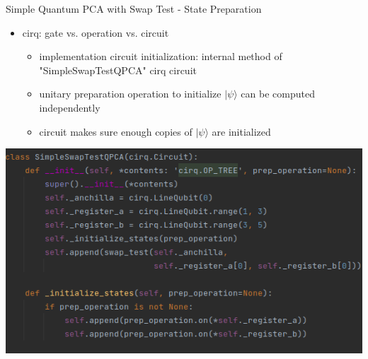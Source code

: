 \begin{frame}{Simple Quantum PCA with Swap Test - State Preparation}
  \begin{minipage}{0.5\textwidth}
    \begin{itemize}
      \item cirq: gate vs. operation vs. circuit
      \begin{itemize}
        \item implementation circuit initialization: internal method of "SimpleSwapTestQPCA" cirq circuit
        \item unitary preparation operation to initialize $|\psi\rangle$ can be computed independently
        \item circuit makes sure enough copies of $|\psi\rangle$ are initialized
      \end{itemize}
    \end{itemize}
  \end{minipage}%
	\begin{minipage}{0.5\textwidth}
    \centering
    \includegraphics[width=1.0\textwidth]{../assets/code-snippet_simple_circuit.png}
  \end{minipage}
\end{frame}



